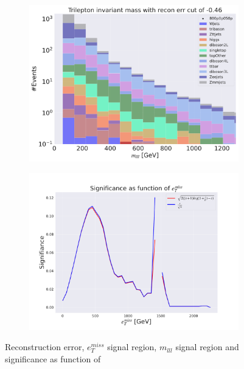 \begin{figure}[H]
    \hfill
    \begin{subfigure}{.40\textwidth}
        \includegraphics[width=\textwidth]{Figures/VAE_testing/small/3lep/b_data_recon_big_rm3_feats_sig_800p0p050p_mlll_recon_errcut_-0.46.pdf}
        \caption{}
        \label{fig:VAE_3lep_small_mlll_800_3}
    \end{subfigure}
    \hfill   
    \begin{subfigure}{.40\textwidth}
        \includegraphics[width=\textwidth]{Figures/VAE_testing/small/3lep/significance_etmiss_800p0p050p_-0.4571280959445052.pdf}
        \caption{}
        \label{fig:VAE_3lep_small_signi_800_3}
    \end{subfigure}
    \hfill      
    \caption[3lep shallow network | $800p50$ | VAE | 3]{Reconstruction error, $e_T^{miss}$ signal region, $m_{lll}$ signal region and significance as function of 
}
\end{figure}
